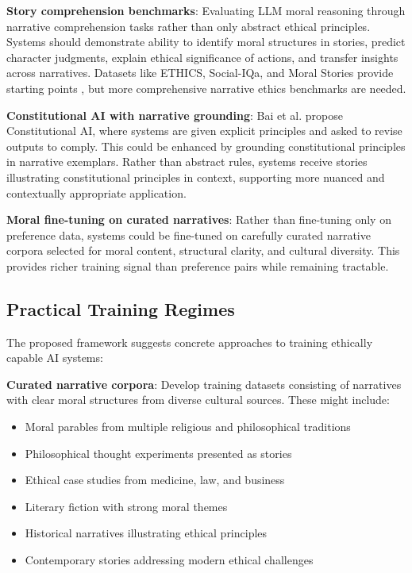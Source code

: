 \documentclass[12pt]{article}
\begin{document}
\textbf{Story comprehension benchmarks}: Evaluating LLM moral reasoning through narrative comprehension tasks rather than only abstract ethical principles. Systems should demonstrate ability to identify moral structures in stories, predict character judgments, explain ethical significance of actions, and transfer insights across narratives. Datasets like ETHICS, Social-IQa, and Moral Stories provide starting points \citep{hendrycks2021aligning, sap2019socialiqa, emelin2021moral}, but more comprehensive narrative ethics benchmarks are needed.

\textbf{Constitutional AI with narrative grounding}: Bai et al. \citep{bai2022constitutional} propose Constitutional AI, where systems are given explicit principles and asked to revise outputs to comply. This could be enhanced by grounding constitutional principles in narrative exemplars. Rather than abstract rules, systems receive stories illustrating constitutional principles in context, supporting more nuanced and contextually appropriate application.

\textbf{Moral fine-tuning on curated narratives}: Rather than fine-tuning only on preference data, systems could be fine-tuned on carefully curated narrative corpora selected for moral content, structural clarity, and cultural diversity. This provides richer training signal than preference pairs while remaining tractable.

\subsection{Practical Training Regimes}

The proposed framework suggests concrete approaches to training ethically capable AI systems:

\textbf{Curated narrative corpora}: Develop training datasets consisting of narratives with clear moral structures from diverse cultural sources. These might include:
\begin{itemize}
\item Moral parables from multiple religious and philosophical traditions
\item Philosophical thought experiments presented as stories
\item Ethical case studies from medicine, law, and business
\item Literary fiction with strong moral themes
\item Historical narratives illustrating ethical principles
\item Contemporary stories addressing modern ethical challenges
\end{itemize}
\end{document}
